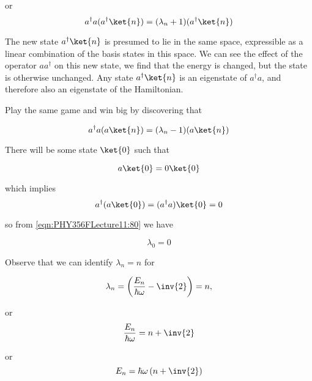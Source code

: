 or
\begin{equation}\label{eqn:PHY356FLecture11:100}
a^\dagger a (a^\dagger \ket{n} ) = (\lambda_n + 1) (a^\dagger \ket{n} )
\end{equation}

The new state $a^\dagger \ket{n}$ is presumed to lie in the same space, expressible as a linear combination of the basis states in this space.  We can see the effect of the operator $a a^\dagger$ on this new state, we find that the energy is changed, but the state is otherwise unchanged.  Any state $a^\dagger \ket{n}$ is an eigenstate of $a^\dagger a$, and therefore also an eigenstate of the Hamiltonian.

Play the same game and win big by discovering that

\begin{equation}\label{eqn:PHY356FLecture11:110}
a^\dagger a ( a \ket{n} ) = (\lambda_n -1) (a \ket{n} )
\end{equation}

There will be some state $\ket{0}$ such that

\begin{equation}\label{eqn:PHY356FLecture11:120}
a \ket{0} = 0 \ket{0}
\end{equation}

which implies
\begin{equation}\label{eqn:PHY356FLecture11:130}
a^\dagger (a \ket{0}) = (a^\dagger a) \ket{0} = 0
\end{equation}

so from \ref{eqn:PHY356FLecture11:80} we have

\begin{equation}\label{eqn:PHY356FLecture11:140}
\lambda_0 = 0
\end{equation}

Observe that we can identify $\lambda_n = n$ for

\begin{equation}\label{eqn:PHY356FLecture11:150}
\lambda_n = \left( \frac{E_n}{\hbar\omega} - \inv{2} \right) = n,
\end{equation}

or
\begin{equation}\label{eqn:PHY356FLecture11:155}
\frac{E_n}{\hbar\omega} = n + \inv{2}
\end{equation}

or
\begin{equation}\label{eqn:PHY356FLecture11:160}
E_n = \hbar \omega \left( n + \inv{2} \right)
\end{equation}

